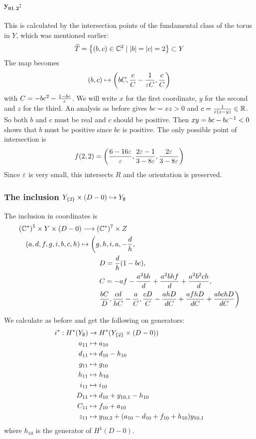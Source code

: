 \paragraph{$\mathbf{y_{01,2}}$:}
This is calculated by the intersection points of the fundamental class
of the torus in $Y$, which was mentioned earlier:
\[ \widehat T = \left\{ (b,c) \in \mathbb{C}^2 \mid \left| b \right|=\left| c \right| = 2 \right\}
\subset Y \]
The map becomes
\[ (b,c) \mapsto \left( bC, \frac{c}{C}-\frac{1}{\varepsilon C},\frac{c}{C}
\right) \]
with $C = -bc^2-\frac{1-bc}{\varepsilon}$. We will write $x$ for the first
coordinate, $y$ for the second and $z$ for the third. An analysis as
before gives $bc = xz > 0$ and $c = \frac{1}{\varepsilon(z-y)} \in
\mathbb{R}$. So both $b$ and $c$ must be real and $c$ should be positive. Then
$xy = bc - b\varepsilon^{-1}<0$ shows that $b$ must be positive since $bc$ is
positive. The only possible point of intersection is
\[ f(2,2) = \left( \frac{6-16\varepsilon}{\varepsilon},
  \frac{2\varepsilon-1}{3-8\varepsilon},\frac{2\varepsilon}{3-8\varepsilon} \right) \]
Since $\varepsilon$ is very small, this intersects $R$ and the orientation is
preserved.

\subsubsection{The inclusion $Y_{\left\{ 2 \right\}}\times (D-0) 
  \hookrightarrow Y_\emptyset$}

The inclusion in coordinates is
\begin{align*}
  (\mathbb{C}^*)^5\times Y \times (D-0) \longrightarrow (&\mathbb{C}^*)^7\times Z \\
  (a,d,f,g,i,b,c,h) \mapsto 
  \bigg(g&,h,i,a,-\frac{d}{h},\\
  & D=\frac{d}{h}(1-bc), \\
  & C= -af-\frac{a^2bh}{d}+\frac{a^2bhf}{d}+\frac{a^2b^2ch}{d}, \\
  & \frac{bC}{D}, \frac{cd}{hC}-\frac{a}{C},
  \frac{cD}{C}-\frac{ahD}{dC}+\frac{afhD}{dC}+
  \frac{abchD}{dC}\bigg)
\end{align*}

We calculate as before and get the following on generators:
\begin{align*}
  i^* : H^*(Y_{\emptyset}) &\to H^*(Y_{\left\{ 2 \right\}}\times (D-0)) \\
  a_{11} & \mapsto a_{10} \\
  d_{11} &\mapsto d_{10} - h_{10} \\
  g_{11} &\mapsto g_{10} \\
  h_{11} &\mapsto h_{10} \\
  i_{11} &\mapsto i_{10} \\
  D_{11} &\mapsto d_{10} + y_{10,1} - h_{10} \\
  C_{11} &\mapsto f_{10} + a_{10} \\
  z_{11} &\mapsto y_{10,2} + (a_{10}-d_{10}+f_{10}+h_{10})y_{10,1}
\end{align*}
where $h_{10}$ is the generator of $H^1(D-0)$.

